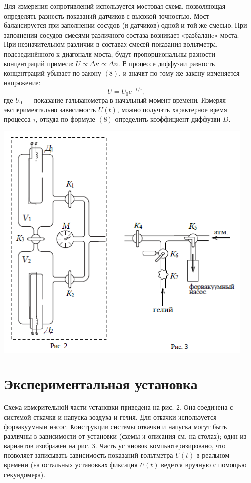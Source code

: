 \documentclass[a4paper,12pt]{article}
\begin{document}
Для измерения сопротивлений используется мостовая схема, позволяющая определять разность показаний датчиков с высокой точностью. Мост балансируется при заполнении сосудов (и датчиков) одной и той же смесью. При заполнении сосудов смесями различного состава возникает «разбаланc» моста. При незначительном различии в составах смесей показания вольтметра, подсоединённого к диагонали моста, будут пропорциональны разности концентраций примеси: $U \propto \Delta \kappa \propto \Delta n$. В процессе диффузии разность концентраций убывает по закону $(8)$, и значит по тому же закону изменяется напряжение: 
\begin{equation}
	U = U_0 e^{-t/\tau},
\end{equation}
где $U_0$ --- показание гальванометра в начальный момент времени. Измеряя экспериментально зависимость $U(t)$, можно получить характерное время процесса $\tau$, откуда по формуле $(8)$ определить коэффициент диффузии $D$.
\begin{center}
    \includegraphics[scale = 0.67]{2212.png}
\end{center}

\section{Экспериментальная установка}

Схема измерительной части установки приведена на рис. 2. Она соединена с системой откачки и напуска воздуха и гелия. Для откачки используется форвакуумный насос. Конструкции системы откачки и напуска могут быть различны в зависимости от установки (схемы и описания см. на столах); один из вариантов изображен на рис. 3. Часть установок компьютеризировано, что позволяет записывать зависимость показаний вольтметра $U(t)$ в реальном времени (на остальных установках фиксация $U(t)$ ведется вручную с помощью секундомера).
\end{document}
